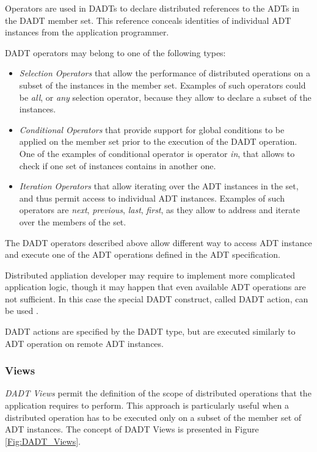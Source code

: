Operators are used in DADTs to declare distributed references to
the ADTs in the DADT member set. This reference conceals identities of individual ADT
instances from the application programmer. 

DADT operators may belong to one of the following types:

\begin{itemize}
  \item \emph{Selection Operators} that allow the performance of
  distributed operations on a subset of the instances in the member set.
  Examples of such operators could be \emph{all}, or \emph{any} selection
  operator, because they allow to declare a subset of the instances.

  \item \emph{Conditional Operators} that provide support for global
  conditions to be applied on the member set prior to the execution of the DADT
  operation. One of the examples of conditional operator is operator
  \emph{in}, that allows to check if one set of instances contains in another
  one.

  \item \emph{Iteration Operators} that allow iterating over the
  ADT instances in the set, and thus permit access to individual ADT instances.
  Examples of such operators are \emph{next}, \emph{previous}, \emph{last},
  \emph{first}, as they allow to address and iterate over the members of the
  set.
\end{itemize}

The DADT operators described above allow different way to access ADT
instance and execute one of the ADT operations defined in the
ADT specification.

Distributed appliation developer may require to implement more complicated
application logic, though it may happen that even available ADT operations
are not sufficient. In this case the special DADT construct, called DADT
action, can be used \cite{migliavacca_DADT:2006}. 

DADT actions are specified by the DADT type, but are executed similarly to ADT
 operation on remote ADT instances.

\subsubsection{Views} \label{subsubsec:views}

\emph{DADT Views} permit the definition of the scope of distributed operations
that the application requires to perform. This approach is particularly useful
when a distributed operation has to be executed only on a subset of the
member set of ADT instances. The concept of DADT Views is presented in Figure
\ref{Fig:DADT_Views}.

